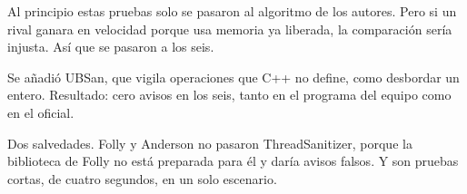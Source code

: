 Al principio estas pruebas solo se pasaron al algoritmo de los autores. Pero si un rival ganara en velocidad porque usa memoria ya liberada, la comparación sería injusta. Así que se pasaron a los seis.

Se añadió UBSan, que vigila operaciones que C++ no define, como desbordar un entero. Resultado: cero avisos en los seis, tanto en el programa del equipo como en el oficial.

Dos salvedades. Folly y Anderson no pasaron ThreadSanitizer, porque la biblioteca de Folly no está preparada para él y daría avisos falsos. Y son pruebas cortas, de cuatro segundos, en un solo escenario.
